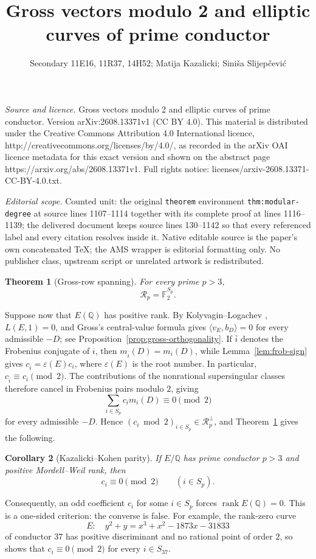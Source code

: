 \documentclass[10pt,a4paper]{amsart}
\newtheorem{theorem}{Theorem}[section]
\newtheorem{corollary}[theorem]{Corollary}
\newcommand{\Q}{\mathbb{Q}}
\newcommand{\F}{\mathbb{F}}
\newcommand{\Rp}{\mathcal{R}_p}
\begin{document}
\title[Gross vectors modulo 2 and elliptic curves of prime conducto]{Gross vectors modulo 2 and elliptic curves of prime conductor}
\author{Secondary 11E16, 11R37, 14H52; Matija Kazalicki; Siniša Slijepčević}
\date{}
\maketitle
\noindent\emph{Source and licence.} Gross vectors modulo 2 and elliptic curves of prime conductor. Version arXiv:2608.13371v1 (CC BY 4.0). This material is distributed under the Creative Commons Attribution 4.0 International licence, http://creativecommons.org/licenses/by/4.0/, as recorded in the arXiv OAI licence metadata for this exact version and shown on the abstract page https://arxiv.org/abs/2608.13371v1. Full rights notice: licenses/arxiv-2608.13371-CC-BY-4.0.txt.\par\smallskip
\noindent\textit{Editorial scope.} Counted unit: the original \texttt{theorem} environment \texttt{thm:modular-degree} at source lines 1107--1114 together with its complete proof at lines 1116--1139; the delivered document keeps source lines 130--1142 so that every referenced label and every citation resolves inside it. Native editable source is the paper's own concatenated TeX; the AMS wrapper is editorial formatting only. No publisher class, upstream script or unrelated artwork is redistributed.
\begin{theorem}[Gross-row spanning]\label{thm:spanning}
For every prime $p>3$,
\[
  \Rp=\F_2^{S_p}.
\]
\end{theorem}

Suppose now that $E(\Q)$ has positive rank. By Kolyvagin--Logachev \cite[Theorem~0.3]{KolyvaginLogachev1990}, $L(E,1)=0$, and Gross's central-value formula \cite[Proposition~13.5]{Gross1987} gives $\langle v_E,b_D\rangle=0$ for every admissible $-D$; see Proposition~\ref{prop:gross-orthogonality}. If $\bar i$ denotes the Frobenius conjugate of $i$, then $m_{\bar i}(D)=m_i(D)$, while Lemma~\ref{lem:frob-sign} gives $c_{\bar i}=\varepsilon(E)c_i$, where $\varepsilon(E)$ is the root number. In particular, $c_{\bar i}\equiv c_i\pmod2$. The contributions of the nonrational supersingular classes therefore cancel in Frobenius pairs modulo $2$, giving
\[
  \sum_{i\in S_p}c_i m_i(D)\equiv0\pmod2
\]
for every admissible $-D$. Hence $(c_i\bmod2)_{i\in S_p}\in\Rp^\perp$, and Theorem~\ref{thm:spanning} gives the following.

\begin{corollary}[Kazalicki--Kohen parity]\label{cor:parity}
If $E/\Q$ has prime conductor $p>3$ and positive Mordell--Weil rank, then
\[
  c_i\equiv0\pmod2\qquad(i\in S_p).
\]
\end{corollary}
Consequently, an odd coefficient $c_i$ for some $i\in S_p$ forces $\operatorname{rank}E(\Q)=0$. This is a one-sided criterion: the converse is false. For example, the rank-zero curve
\[
  E:\quad y^2+y=x^3+x^2-1873x-31833
\]
of conductor $37$ has positive discriminant and no rational point of order
$2$, so \cite[Theorem~1.4]{KazalickiKohen2017} shows that
$c_i\equiv0\pmod2$ for every $i\in S_{37}$.
\end{document}
